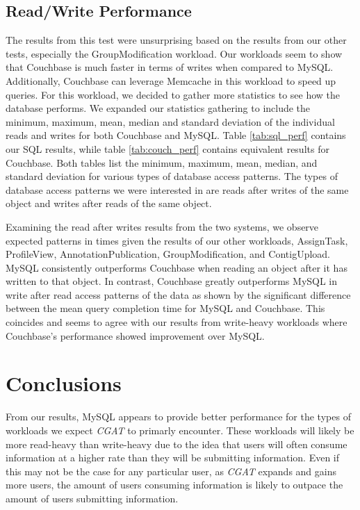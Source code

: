 \documentclass[10pt, conference, compsocconf]{IEEEtran}
\begin{document}
\subsection{Read/Write Performance}
The results from this test were unsurprising based on the results from our
other tests, especially the GroupModification workload. Our workloads seem to
show that Couchbase is much faster in terms of writes when compared to MySQL.
Additionally, Couchbase can leverage Memcache in this workload to speed up
queries. For this workload, we decided to gather more statistics to see how the
database performs. We expanded our statistics gathering to include the minimum,
maximum, mean, median and standard deviation of the individual reads and writes
for both Couchbase and MySQL. Table \ref{tab:sql_perf} contains our SQL
results, while table \ref{tab:couch_perf} contains equivalent results for
Couchbase. Both tables list the minimum, maximum, mean, median, and standard
deviation for various types of database access patterns. The types of database
access patterns we were interested in are reads after writes of the same object
and writes after reads of the same object.

Examining the read after writes results from the two systems, we observe
expected patterns in times given the results of our other workloads,
AssignTask, ProfileView, AnnotationPublication, GroupModification, and
ContigUpload. MySQL consistently outperforms Couchbase when reading an object
after it has written to that object. In contrast, Couchbase greatly outperforms
MySQL in write after read access patterns of the data as shown by the
significant difference between the mean query completion time for MySQL and
Couchbase. This coincides and seems to agree with our results from write-heavy
workloads where Couchbase's performance showed improvement over MySQL.

\section{Conclusions}\label{sec:conclusions}
From our results, MySQL appears to provide better performance for the types of
workloads we expect \textit{CGAT} to primarly encounter. These workloads will
likely be more read-heavy than write-heavy due to the idea that users will
often consume information at a higher rate than they will be submitting
information. Even if this may not be the case for any particular user, as
\textit{CGAT} expands and gains more users, the amount of users consuming
information is likely to outpace the amount of users submitting information.
\end{document}
